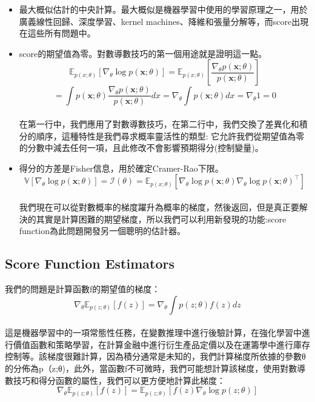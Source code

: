 \documentclass[14pt,a4paper]{report}  %
\begin{document}
\begin{itemize}
\item 最大概似估計的中央計算。最大概似是機器學習中使用的學習原理之一，用於廣義線性回歸、深度學習、kernel machines、降維和張量分解等，而score出現在這些所有問題中。
\end{itemize}
\begin{itemize}
\item  score的期望值為零。對數導數技巧的第一個用途就是證明這一點。\\
$$\mathbb{E}_{p(x; \theta)}[\nabla_\theta \log p(\mathbf{x}; \theta)] =\mathbb{E}_{p(x; \theta)}\left[\frac{\nabla_\theta p(\mathbf {x}; \theta)}{p(\mathbf{x}; \theta)} \right]$$
$$= \int p(\mathbf {x}; \theta) \frac{\nabla_\theta p(\mathbf {x}; \theta)}{p(\mathbf{x}; \theta)} dx= \nabla_\theta \int p(\mathbf{x}; \theta) dx=\nabla_\theta 1 = 0$$\\
\qquad 在第一行中，我們應用了對數導數技巧，在第二行中，我們交換了差異化和積分的順序，這種特性是我們尋求概率靈活性的類型:  它允許我們從期望值為零的分數中減去任何一項，且此修改不會影響預期得分(控制變量)。
\end{itemize}
\begin{itemize}
\item 得分的方差是Fisher信息，用於確定Cramer-Rao下限。\\
$$\mathbb{V}[\nabla_\theta \log p(\mathbf{x}; \theta)] = \mathcal{I}(\theta) =\mathbb{E}_{p(x; \theta)}[\nabla_\theta \log p(\mathbf{x}; \theta)\nabla_\theta \log p(\mathbf{x}; \theta)^\top]$$\\
我們現在可以從對數概率的梯度躍升為概率的梯度，然後返回，但是真正要解決的其實是計算困難的期望梯度，所以我們可以利用新發現的功能:score function為此問題開發另一個聰明的估計器。
\end{itemize}
\subsection{Score Function Estimators}
我們的問題是計算函數f的期望值的梯度：\\
$$\nabla_\theta \mathbb{E}_{p(z;\theta)}[f(z)] =\nabla_\theta \int p(z; \theta)f(z) dz$$\\

\qquad 這是機器學習中的一項常態性任務，在變數推理中進行後驗計算，在強化學習中進行價值函數和策略學習，在計算金融中進行衍生產品定價以及在運籌學中進行庫存控制等。該梯度很難計算，因為積分通常是未知的，我們計算梯度所依據的參數θ的分佈為p（z;θ)，此外，當函數f不可微時，我們可能想計算該梯度，使用對數導數技巧和得分函數的屬性，我們可以更方便地計算此梯度：\\
$$\nabla_\theta \mathbb{E}_{p(z;\theta)}[f(z)] = \mathbb{E}_{p(z;\theta)}[f(z)\nabla_\theta \log p(z;\theta)]$$\\
\end{document}
